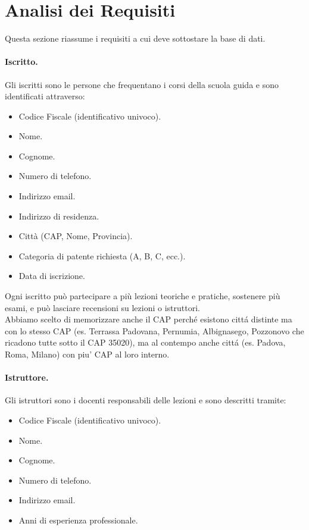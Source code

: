 \documentclass[10pt,twoside]{article}
\begin{document}
\section{Analisi dei Requisiti}{
    \label{sec:analisiRequisiti}
    Questa sezione riassume i requisiti a cui deve sottostare la base di dati.

    \paragraph{Iscritto.}
    Gli iscritti sono le persone che frequentano i corsi della scuola guida e sono identificati attraverso:

    \begin{itemize}
        \item Codice Fiscale (identificativo univoco).
        \item Nome.
        \item Cognome.
        \item Numero di telefono.
        \item Indirizzo email.
        \item Indirizzo di residenza.
        \item Città (CAP, Nome, Provincia). 
        \item Categoria di patente richiesta (A, B, C, ecc.).
        \item Data di iscrizione.
    \end{itemize}
    
    Ogni iscritto può partecipare a più lezioni teoriche e pratiche, sostenere più esami, e può lasciare recensioni su lezioni o istruttori. \\
    Abbiamo scelto di memorizzare anche il CAP perché esistono cittá distinte ma con lo stesso CAP (es. Terrassa Padovana, Pernumia, Albignasego, Pozzonovo che ricadono tutte sotto il CAP 35020), ma al contempo anche cittá (es. Padova, Roma, Milano) con piu' CAP al loro interno.
    

    \paragraph{Istruttore.}
    Gli istruttori sono i docenti responsabili delle lezioni e sono descritti tramite:
    
    \begin{itemize}
        \item Codice Fiscale (identificativo univoco).
        \item Nome.
        \item Cognome.
        \item Numero di telefono.
        \item Indirizzo email.
        \item Anni di esperienza professionale.
    \end{itemize}

}
\end{document}
